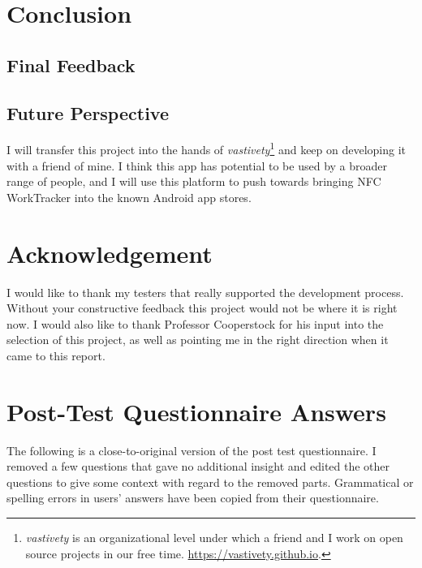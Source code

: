\documentclass[conference]{IEEEtran}
\newcommand{\projectname}{NFC WorkTracker}
\begin{document}
\section{Conclusion}

\subsection{Final Feedback}

\subsection{Future Perspective}
I will transfer this project into the hands of \textit{vastivety}\footnote{\textit{vastivety} is an organizational level under which a friend and I work on open source projects in our free time. \url{https://vastivety.github.io}.} and keep on developing it with a friend of mine. I think this app has potential to be used by a broader range of people, and I will use this platform to push towards bringing {\projectname} into the known Android app stores.

\section*{Acknowledgement}
I would like to thank my testers that really supported the development process. Without your constructive feedback this project would not be where it is right now. I would also like to thank Professor Cooperstock for his input into the selection of this project, as well as pointing me in the right direction when it came to this report.





\appendices

\section{Post-Test Questionnaire Answers}
\label{app:questionnaire}
The following is a close-to-original version of the post test questionnaire. I removed a few questions that gave no additional insight and edited the other questions to give some context with regard to the removed parts. Grammatical or spelling errors in users' answers have been copied from their questionnaire.
\end{document}
